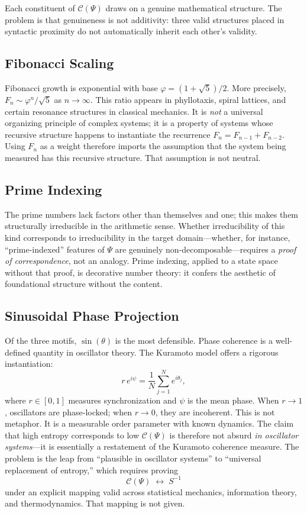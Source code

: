 \documentclass[12pt]{article}
\begin{document}
Each constituent of $\mathcal{C}(\Psi)$ draws on a genuine mathematical structure. The problem is that genuineness is not additivity: three valid structures placed in syntactic proximity do not automatically inherit each other's validity.

\subsection{Fibonacci Scaling}

Fibonacci growth is exponential with base $\varphi = (1 + \sqrt{5})/2$. More precisely, $F_n \sim \varphi^n / \sqrt{5}$ as $n \to \infty$. This ratio appears in phyllotaxis, spiral lattices, and certain resonance structures in classical mechanics. It is \emph{not} a universal organizing principle of complex systems; it is a property of systems whose recursive structure happens to instantiate the recurrence $F_n = F_{n-1} + F_{n-2}$. Using $F_n$ as a weight therefore imports the assumption that the system being measured has this recursive structure. That assumption is not neutral.

\subsection{Prime Indexing}

The prime numbers lack factors other than themselves and one; this makes them structurally irreducible in the arithmetic sense. Whether irreducibility of this kind corresponds to irreducibility in the target domain---whether, for instance, ``prime-indexed'' features of $\Psi$ are genuinely non-decomposable---requires a \emph{proof of correspondence}, not an analogy. Prime indexing, applied to a state space without that proof, is decorative number theory: it confers the aesthetic of foundational structure without the content.

\subsection{Sinusoidal Phase Projection}

Of the three motifs, $\sin(\theta)$ is the most defensible. Phase coherence is a well-defined quantity in oscillator theory. The Kuramoto model offers a rigorous instantiation:
\[
  r\,e^{i\psi} = \frac{1}{N}\sum_{j=1}^N e^{i\theta_j},
\]
where $r \in [0,1]$ measures synchronization and $\psi$ is the mean phase. When $r \to 1$, oscillators are phase-locked; when $r \to 0$, they are incoherent. This is not metaphor. It is a measurable order parameter with known dynamics. The claim that high entropy corresponds to low $\mathcal{C}(\Psi)$ is therefore not absurd \emph{in oscillator systems}---it is essentially a restatement of the Kuramoto coherence measure. The problem is the leap from ``plausible in oscillator systems'' to ``universal replacement of entropy,'' which requires proving
\[
  \mathcal{C}(\Psi) \;\longleftrightarrow\; S^{-1}
\]
under an explicit mapping valid across statistical mechanics, information theory, and thermodynamics. That mapping is not given.
\end{document}
